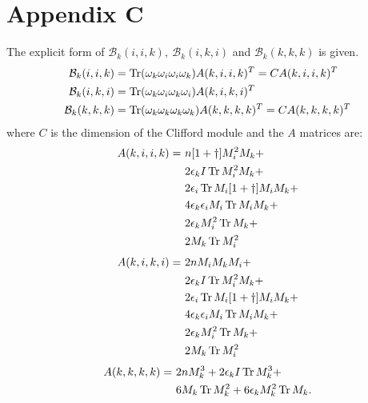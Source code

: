 \section*{Appendix C}
The explicit form of $\mathcal{B}_k(i,i,k), \ \mathcal{B}_k(i,k,i)$ and $\mathcal{B}_k(k,k,k)$ is given.
\begin{align}
\mathcal{B}_k(i,i,k) &= \operatorname{Tr}(\omega_k \omega_i \omega_i \omega_k)A(k, i, i, k)^T = CA(k,i,i,k)^T \\ \notag
\mathcal{B}_k(i,k,i) &= \operatorname{Tr}(\omega_k \omega_i \omega_k \omega_i)A(k, i, k, i)^T \\ \notag
\mathcal{B}_k(k,k,k) &= \operatorname{Tr}(\omega_k \omega_k \omega_k \omega_k)A(k, k, k, k)^T = CA(k,k,k,k)^T
\end{align}
where $C$ is the dimension of the Clifford module and the $A$ matrices are:
\begin{align}
A(k,i,i,k) = \ &n [1+\dagger] M_i^2 M_k + \notag \\
&2\epsilon_k I \operatorname{Tr} M_i^2 M_k + \notag \\
&2\epsilon_i \operatorname{Tr} M_i [1 + \dagger] M_i M_k + \notag \\
&4\epsilon_k \epsilon_i M_i \operatorname{Tr} M_i M_k + \notag \\
&2\epsilon_k M_i^2 \operatorname{Tr} M_k + \notag \\
&2M_k \operatorname{Tr} M_i^2
\end{align}
\begin{align}
A(k,i,k,i) = \ &2n M_i M_k M_i + \notag \\
&2\epsilon_k I \operatorname{Tr} M_i^2 M_k + \notag \\
&2\epsilon_i \operatorname{Tr} M_i [1+\dagger] M_i M_k + \notag \\
&4\epsilon_k \epsilon_i M_i \operatorname{Tr} M_i M_k + \notag \\
&2\epsilon_k M_i^2 \operatorname{Tr} M_k + \notag \\
&2M_k \operatorname{Tr} M_i^2
\end{align}
\begin{align}
A(k,k,k,k) = \ &2n M_k^3 + 2\epsilon_k I \operatorname{Tr} M_k^3 + \notag \\
&6 M_k \operatorname{Tr} M_k^2 + 6\epsilon_k M_k^2 \operatorname{Tr} M_k.
\end{align}

